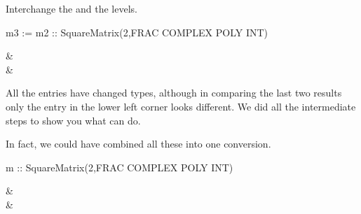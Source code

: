 \begin{xtc}
\begin{xtccomment}
Interchange the  and the
 levels.
\end{xtccomment}
\begin{spadsrc}
m3 := m2 :: SquareMatrix(2,FRAC COMPLEX POLY INT) 
\end{spadsrc}
\begin{TeXOutput}
\begin{fricasmath}{7}
\begin{MATRIX}{2}&\\&\end{MATRIX}%
\end{fricasmath}
\end{TeXOutput}
\end{xtc}

All the entries have changed types, although in comparing the
last two results only the entry in the lower left corner looks different.
We did all the intermediate steps to show you what \Language{} can do.

\begin{xtc}
\begin{xtccomment}
In fact, we could have combined all these into one conversion.
\end{xtccomment}
\begin{spadsrc}
m :: SquareMatrix(2,FRAC COMPLEX POLY INT) 
\end{spadsrc}
\begin{TeXOutput}
\begin{fricasmath}{8}
\begin{MATRIX}{2}&\\&\end{MATRIX}%
\end{fricasmath}
\end{TeXOutput}
\end{xtc}

